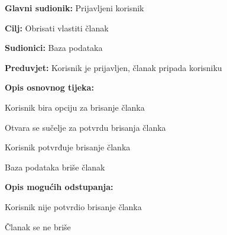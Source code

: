 \noindent {}
\begin{packed_item}

\item \textbf{Glavni sudionik:} Prijavljeni korisnik
\item  \textbf{Cilj:} Obrisati vlastiti članak
\item  \textbf{Sudionici:} Baza podataka
\item  \textbf{Preduvjet:} Korisnik je prijavljen, članak pripada korisniku
\item  \textbf{Opis osnovnog tijeka:}

\item[] \begin{packed_enum}

    \item Korisnik bira opciju za brisanje članka
    \item Otvara se sučelje za potvrdu brisanja članka
    \item Korisnik potvrđuje brisanje članka
    \item Baza podataka briše članak

\end{packed_enum}

\item  \textbf{Opis mogućih odstupanja:}

\item[] \begin{packed_item}

    \item[3.a] Korisnik nije potvrdio brisanje članka
    \item[] \begin{packed_enum}

        \item Članak se ne briše

    \end{packed_enum}

\end{packed_item}
\end{packed_item}

